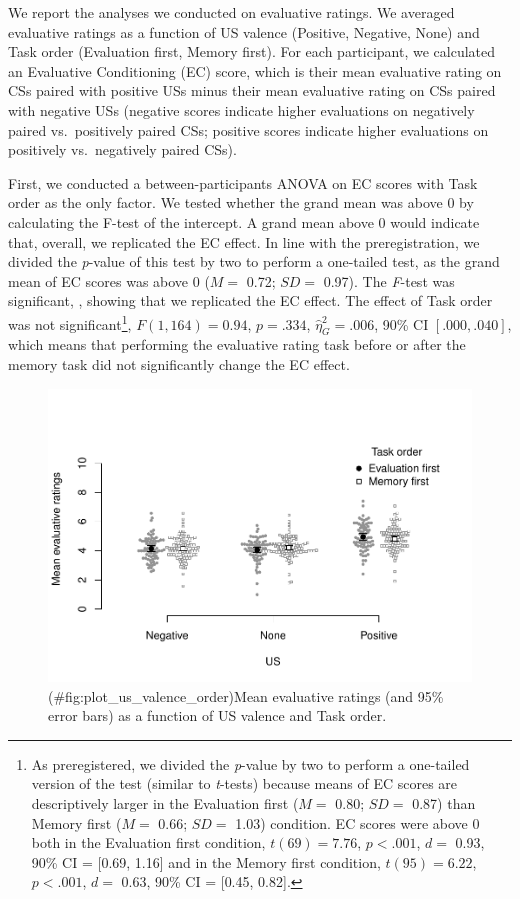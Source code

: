 \documentclass[
  man,floatsintext]{apa6}
\begin{document}
We report the analyses we conducted on evaluative ratings. We averaged evaluative ratings as a function of US valence (Positive, Negative, None) and Task order (Evaluation first, Memory first). For each participant, we calculated an Evaluative Conditioning (EC) score, which is their mean evaluative rating on CSs paired with positive USs minus their mean evaluative rating on CSs paired with negative USs (negative scores indicate higher evaluations on negatively paired vs.~positively paired CSs; positive scores indicate higher evaluations on positively vs.~negatively paired CSs).

First, we conducted a between-participants ANOVA on EC scores with Task order as the only factor. We tested whether the grand mean was above 0 by calculating the F-test of the intercept. A grand mean above 0 would indicate that, overall, we replicated the EC effect. In line with the preregistration, we divided the \emph{p}-value of this test by two to perform a one-tailed test, as the grand mean of EC scores was above 0 (\(M =\) 0.72; \(SD =\) 0.97). The \emph{F}-test was significant, , showing that we replicated the EC effect. The effect of Task order was not significant\footnote{As preregistered, we divided the \emph{p}-value by two to perform a one-tailed version of the test (similar to \emph{t}-tests) because means of EC scores are descriptively larger in the Evaluation first (\(M =\) 0.80; \(SD =\) 0.87) than Memory first (\(M =\) 0.66; \(SD =\) 1.03) condition. EC scores were above 0 both in the Evaluation first condition, \(t(69) = 7.76\), \(p < .001\), \(d =\) 0.93, 90\% CI = {[}0.69, 1.16{]} and in the Memory first condition, \(t(95) = 6.22\), \(p < .001\), \(d =\) 0.63, 90\% CI = {[}0.45, 0.82{]}.}, \(F(1, 164) = 0.94\), \(p = .334\), \(\hat{\eta}^2_G = .006\), 90\% CI \([.000, .040]\), which means that performing the evaluative rating task before or after the memory task did not significantly change the EC effect.

\begin{figure}
\centering
\includegraphics{main_files/figure-latex/plot_us_valence_order-1.pdf}
\caption{(\#fig:plot\_us\_valence\_order)Mean evaluative ratings (and 95\% error bars) as a function of US valence and Task order.}
\end{figure}
\end{document}
